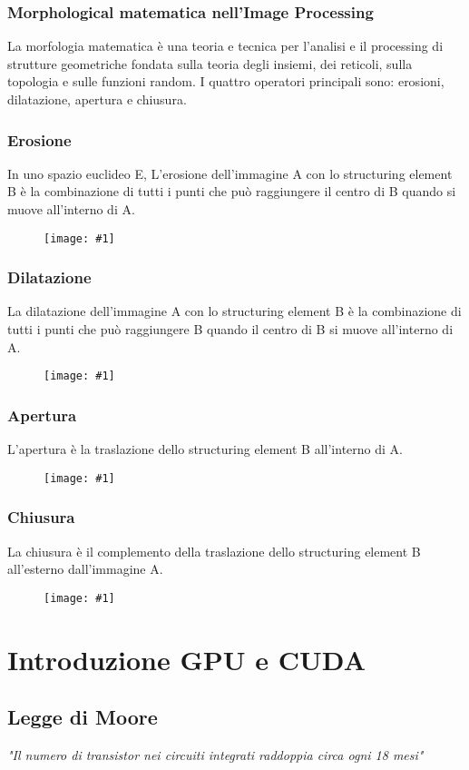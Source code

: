 \documentclass[8pt,a4paper]{article}
\newcommand{\f}[1]{
      \begin{figure}[H]
        \center
      \texttt{[image: \#1]}
      \end{figure}
}
\begin{document}
\begin{multicols}{5}
    \subsubsection{Morphological matematica nell'Image Processing}
    La morfologia matematica è una teoria e tecnica per l’analisi e il processing 
    di strutture geometriche fondata sulla teoria degli insiemi, dei reticoli, 
    sulla topologia e sulle funzioni random.
    I quattro operatori principali sono: erosioni, dilatazione, apertura e chiusura.
    \subsubsection{Erosione}
    In uno spazio euclideo E, L’erosione dell’immagine A con lo structuring element 
    B è la combinazione di tutti i punti che può raggiungere il centro di B quando 
    si muove all’interno di A.
    \f{erosion}
    \subsubsection{Dilatazione}
    La dilatazione dell’immagine A con lo structuring element B è la combinazione 
    di tutti i punti che può raggiungere B quando il centro di B si muove all’interno 
    di A.
    \f{dilatation}
    \subsubsection{Apertura}
    L'apertura è la traslazione dello structuring element B all'interno di A.
    \f{open}
    \subsubsection{Chiusura}
    La chiusura è il complemento della traslazione dello structuring element B 
    all’esterno dall’immagine A.
    \f{closure}


    \section{Introduzione GPU e CUDA}

    \subsection{Legge di Moore}
    \textit{"Il numero di transistor nei circuiti integrati raddoppia circa ogni 18 mesi"}

\end{multicols}
\end{document}
